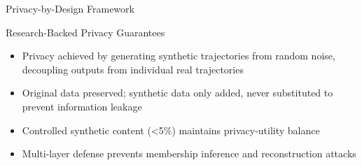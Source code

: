 \documentclass[aspectratio=169,xcolor={dvipsnames}]{beamer}
\begin{document}
\begin{frame}{Privacy-by-Design Framework}
  \begin{center}
  \end{center}
  \vspace{1em}
  \begin{block}{Research-Backed Privacy Guarantees}
    \small
    \begin{itemize}
      \item Privacy achieved by generating synthetic trajectories from random noise, decoupling outputs from individual real trajectories
      \item Original data preserved; synthetic data only added, never substituted to prevent information leakage
      \item Controlled synthetic content (<5\%) maintains privacy-utility balance
      \item Multi-layer defense prevents membership inference and reconstruction attacks \cite{buchholzSystematisationKnowledgeTrajectory2024}
    \end{itemize}
  \end{block}
\end{frame}
\end{document}
